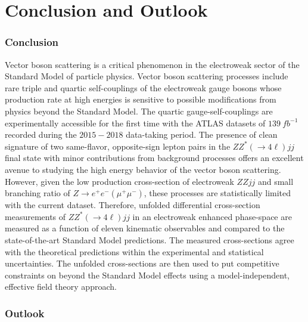 \part {\LARGE{Conclusion and Outlook}}

\section{Conclusion}
\label{sec:Conclusion}

Vector boson scattering is a critical phenomenon in the electroweak sector of the Standard Model of particle physics. Vector boson scattering processes include rare triple and quartic self-couplings of the electroweak gauge bosons whose production rate at high energies is sensitive to possible modifications from physics beyond the Standard Model. The quartic gauge-self-couplings are experimentally accessible for the first time with the ATLAS datasets of $139 ~fb^{-1}$ recorded during the $2015-2018$ data-taking period. The presence of clean signature of two same-flavor, opposite-sign lepton pairs in the $ZZ^*(\rightarrow 4\ell) jj$ final state with minor contributions from background processes offers an excellent avenue to studying the high energy behavior of the vector boson scattering. However, given the low production cross-section of electroweak $ZZjj$ and small branching ratio of $Z\rightarrow e^+e^- (\mu^+\mu^-)$, these processes are statistically limited with the current dataset. Therefore, unfolded differential cross-section measurements of $ZZ^*(\rightarrow 4\ell) jj$ in an electroweak enhanced phase-space are measured as a function of eleven kinematic observables and compared to the state-of-the-art Standard Model predictions. The measured cross-sections agree with the theoretical predictions within the experimental and statistical uncertainties. The unfolded cross-sections are then used to put competitive constraints on beyond the Standard Model effects using a model-independent, effective field theory approach. 

\section{Outlook}
\label{sec:Outlook}

